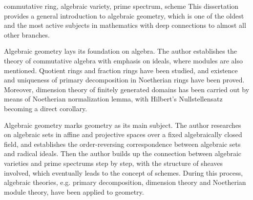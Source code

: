 

\begin{abstract}{交换幺环, 代数簇, 素谱, 概型}
  代数几何历史悠久而又充满活力, 与其它数学分支有着深刻的联系, 是一门重要的学科. 代数几何包含代数与几何, 可以认为是将代数理论应用到几何的研究之中.

  代数几何的理论根基在于代数. 本文从基本定义开始建立了以环论为主模论为辅的交换代数理论, 研究了商环与分式环的基本性质, 证明了Noether环上准素分解的存在性及其满足的唯一性, 以域论为基础利用Noether正规化引理证明了域的有限生成整环上的维数定理以及重要的Hilbert零点定理.

  代数几何的研究对象在于几何. 本文研究了固定代数闭域上的仿射与射影空间中的代数集, 建立了根式理想与代数集之间的对应, 并逐步建立了代数簇与素谱之间的对应, 最终引出了概型的概念. 同时, 本文也将代数中的准素分解, 维数理论与几何相联系, 并将Noether模论应用到几何中.
\end{abstract}

\begin{abstract*}{commutative ring, algebraic variety, prime spectrum, scheme}
  This dissertation provides a general introduction to algebraic geometry, which is one of the oldest and the most active subjects in mathematics with deep connections to almost all other branches.

  Algebraic geometry lays its foundation on algebra. The author establishes the theory of commutative algebra with emphasis on ideals, where modules are also mentioned. Quotient rings and fraction rings have been studied, and existence and uniqueness of primary decomposition in Noetherian rings have been proved. Moreover, dimension theory of finitely generated domains has been carried out by means of Noetherian normalization lemma, with Hilbert's Nullstellensatz becoming a direct corollary.

  Algebraic geometry marks geometry as its main subject. The author researches on algebraic sets in affine and projective spaces over a fixed algebraically closed field, and establishes the order-reversing correspondence between algebraic sets and radical ideals. Then the author builds up the connection between algebraic varieties and prime spectrums step by step, with the structure of sheaves involved, which eventually leads to the concept of schemes. During this process, algebraic theories, e.g. primary decomposition, dimension theory and Noetherian module theory, have been applied to geometry.
\end{abstract*}
